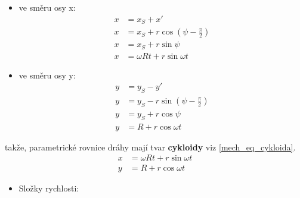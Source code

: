 \begin{example}
          \begin{minipage}[t]{0.5\textwidth}%
            \begin{itemize}
              \item ve směru osy x:                                        
              \begin{align*}
                x &= x_S + x'                        \\
                x &= x_S + r\cos(\psi-\frac{\pi}{2}) \\
                x &= x_S + r\sin\psi                 \\
                x &= \omega R t + r\sin\omega t
              \end{align*}
              \end{itemize}  
          \end{minipage}%
          \begin{minipage}[t]{0.5\textwidth}
           \begin{itemize}
              \item ve směru osy y: 
              \begin{align*}
                y &= y_S - y'                        \\
                y &= y_S - r\sin(\psi-\frac{\pi}{2}) \\
                y &= y_S + r\cos\psi                 \\
                y &= R + r\cos\omega t
              \end{align*}
            \end{itemize}                 
          \end{minipage}
          takže, parametrické rovnice dráhy mají tvar \textbf{cykloidy} viz
          \ref{mech_eq_cykloida}.
          \begin{align}\label{mech_eq_cykloida}
            x &= \omega R t + r\sin\omega t\\
            y &= R + r\cos\omega t
          \end{align}
          \begin{itemize}
            \item Složky rychlosti:
              \begin{align}\label{mech_eq_cykloida_v}

\end{align}
\end{itemize}
\end{example}

